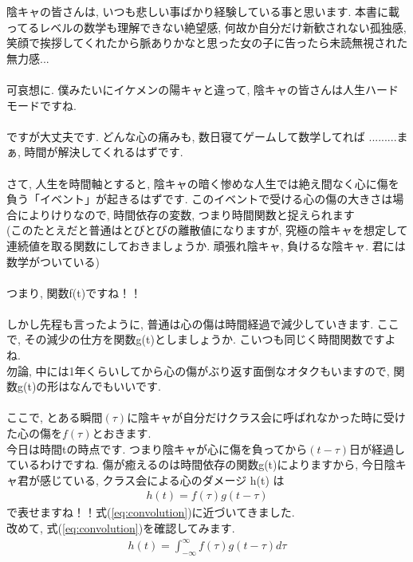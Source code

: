 \documentclass[11pt,a4paper]{jreport}
\begin{document}
陰キャの皆さんは, いつも悲しい事ばかり経験している事と思います. 本書に載ってるレベルの数学も理解できない絶望感, 何故か自分だけ新歓されない孤独感, 笑顔で挨拶してくれたから脈ありかなと思った女の子に告ったら未読無視された無力感...\\
\\
可哀想に. 僕みたいにイケメンの陽キャと違って, 陰キャの皆さんは人生ハードモードですね.\\
\\
ですが大丈夫です. どんな心の痛みも, 数日寝てゲームして数学してれば
.........まぁ, 時間が解決してくれるはずです. \\
\\
さて, 人生を時間軸とすると, 陰キャの暗く惨めな人生では絶え間なく心に傷を負う「イベント」が起きるはずです. このイベントで受ける心の傷の大きさは場合によりけりなので, 時間依存の変数, つまり時間関数と捉えられます\\
(このたとえだと普通はとびとびの離散値になりますが, 究極の陰キャを想定して連続値を取る関数にしておきましょうか. 頑張れ陰キャ, 負けるな陰キャ. 君には数学がついている)\\
\\
つまり, 関数f(t)ですね！！\\
\\
しかし先程も言ったように, 普通は心の傷は時間経過で減少していきます. ここで, その減少の仕方を関数g(t)としましょうか. こいつも同じく時間関数ですよね.\\
勿論, 中には1年くらいしてから心の傷がぶり返す面倒なオタクもいますので, 関数g(t)の形はなんでもいいです.\\
\\
ここで, とある瞬間$(\tau)$に陰キャが自分だけクラス会に呼ばれなかった時に受けた心の傷を$f(\tau)$とおきます.\\
今日は時間tの時点です. つまり陰キャが心に傷を負ってから$(t-\tau)$日が経過しているわけですね. 傷が癒えるのは時間依存の関数g(t)によりますから, 今日陰キャ君が感じている, クラス会による心のダメージ h(t) は
\begin{eqnarray}
\label{eq:inkya_otu}
h(t) = f(\tau) g(t-\tau)
\end{eqnarray}
で表せますね！！式(\ref{eq:convolution})に近づいてきました. \\
改めて, 式(\ref{eq:convolution})を確認してみます.
\begin{eqnarray}
h(t) = \int^{\infty}_{-\infty} f(\tau) g(t - \tau) d\tau
\end{eqnarray}
\end{document}
